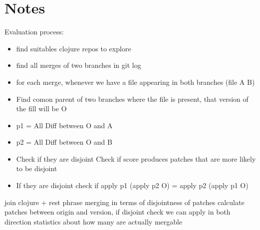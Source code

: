 \documentclass[11pt]{article}
\begin{document}
\section{Notes}
Evaluation process:
\begin{itemize}
   \item find suitables clojure repos to explore
  \item find all merges of two branches in git log
  \item for each merge, whenever we have a file appearing in both branches (file A B)
  \item Find comon parent of two branches where the file is present, that version of the fill will be O
  \item p1 = All Diff between O and A
  \item p2 = All Diff between O and B 
  \item Check if they are disjoint
      \subitem Check if score produces patches that are more likely to be disjoint
  \item If they are disjoint check if apply p1 (apply p2 O) = apply p2 (apply p1 O)
  
\end{itemize}
 

join clojure + rest phrase merging in terms of disjointness of patches
calculate patches between origin and version, if disjoint check we can
apply in both direction statistics about how many are actually mergable
\end{document}
